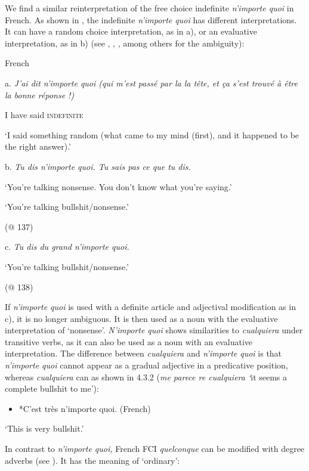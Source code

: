 We find a similar reinterpretation of the free choice indefinite \textit{n’importe quoi} in French. As shown in , the indefinite \textit{n’importe quoi} has different interpretations. It can have a random choice interpretation, as in a), or an evaluative interpretation, as in b) (see \citealt{Larrivée2007}, \citealt{Paillard1998}, \citealt{Pescarini2009}, among others for the ambiguity):

\label{bkm:Ref62641804}  French

  a.  \textit{J’ai dit n’importe quoi (qui m’est passé par la la tête, et ça s’est trouvé à être la bonne réponse !)} 

I have said \textsc{indefinite}

‘I said something random (what came to my mind (first), and it happened to be the right answer).’

    \citep{Larrivée2007}

  b.  \textit{Tu dis n’importe quoi. Tu sais pas ce que tu dis.}

‘You’re talking nonsense. You don’t know what you’re saying.’

‘You’re talking bullshit/nonsense.’

    (@ 137)

  c.  \textit{Tu dis du grand n’importe quoi.}

‘You’re talking bullshit/nonsense.’

    (@ 138)

If \textit{n’importe quoi} is used with a definite article and adjectival modification as in c), it is no longer ambiguous. It is then used as a noun with the evaluative interpretation of ‘nonsense’. \textit{N’importe quoi} shows similarities to \textit{cualquiera} under transitive verbs, as it can also be used as a noun with an evaluative interpretation. The difference between \textit{cualquiera} and \textit{n’importe quoi} is that \textit{n’importe quoi} cannot appear as a gradual adjective in a predicative position, whereas \textit{cualquiera} can as shown in 4.3.2 (\textit{me parece re cualquiera ‘}it seems a complete bullshit to me’):

\begin{itemize}
\item {       *C’est très n’importe quoi.                                     (French)}
\end{itemize}
{‘This is very bullshit.’}

In contrast to \textit{n’importe quoi,} French FCI \textit{quelconque} can be modified with degree adverbs (see \citealt{Vlachou2007}). It has the meaning of ‘ordinary’:


